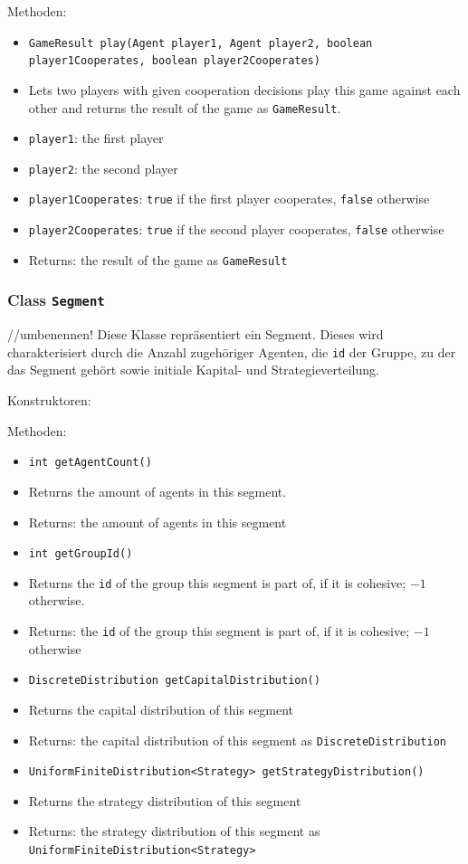 \documentclass[parskip=full,11pt]{scrartcl}
\begin{document}
Methoden:
\begin{itemize}\itemsep -10pt
\item[] \texttt{GameResult play(Agent player1, Agent player2, boolean player1Cooperates, boolean player2Cooperates)}
\item[] Lets two players with given cooperation decisions play this game against each other and returns the result of the game as \texttt{GameResult}.
\item[] \texttt{player1}: the first player
\item[] \texttt{player2}: the second player
\item[] \texttt{player1Cooperates}: \texttt{true} if the first player cooperates, \texttt{false} otherwise
\item[] \texttt{player2Cooperates}: \texttt{true} if the second player cooperates, \texttt{false} otherwise
\item[] Returns: the result of the game as \texttt{GameResult}
\end{itemize}

\subsubsection{Class \texttt{Segment}}
//umbenennen!
Diese Klasse repräsentiert ein Segment. Dieses wird charakterisiert durch die Anzahl zugehöriger Agenten, die \texttt{id} der Gruppe, zu der das Segment gehört sowie initiale Kapital- und Strategieverteilung.

Konstruktoren:

Methoden:
\begin{itemize}\itemsep -10pt
\item \texttt{int getAgentCount()}
\item[] Returns the amount of agents in this segment.
\item[] Returns: the amount of agents in this segment

\item \texttt{int getGroupId()}
\item[] Returns the \texttt{id} of the group this segment is part of, if it is cohesive; \(-1\) otherwise.
\item[] Returns: the \texttt{id} of the group this segment is part of, if it is cohesive; \(-1\) otherwise

\item \texttt{DiscreteDistribution getCapitalDistribution()}
\item[] Returns the capital distribution of this segment
\item[] Returns: the capital distribution of this segment as \texttt{DiscreteDistribution}

\item \texttt{UniformFiniteDistribution<Strategy> getStrategyDistribution()}
\item[] Returns the strategy distribution of this segment
\item[] Returns: the strategy distribution of this segment as \texttt{UniformFiniteDistribution<Strategy>}
\end{itemize}
\end{document}
